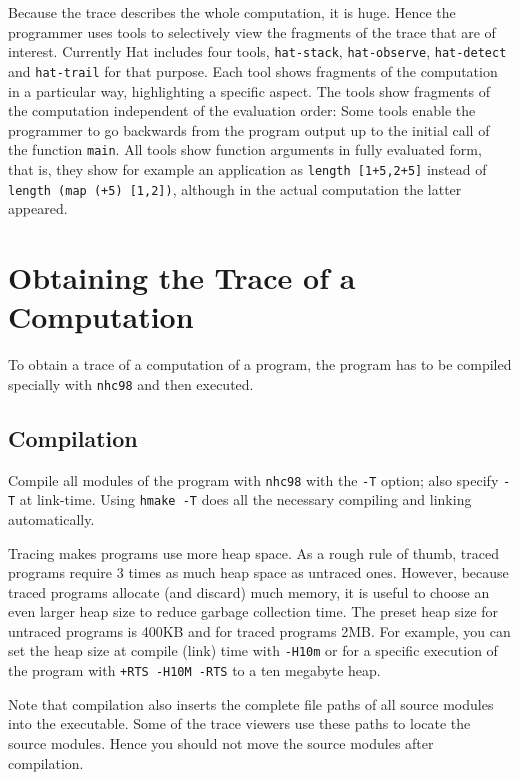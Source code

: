 \documentclass[12pt]{article}
\begin{document}
Because the trace describes the whole computation, it is huge. Hence the programmer uses tools to selectively view the fragments of the trace that are of interest.
Currently Hat includes four tools, \texttt{hat-stack}, \texttt{hat-observe}, \texttt{hat-detect} and \texttt{hat-trail} for that purpose. Each tool shows fragments of the computation in a particular way, highlighting a specific aspect.
The tools show fragments of the computation independent of the evaluation order:
Some tools enable the programmer to go backwards from the program output up to the initial call of the function \texttt{main}.
All tools show function arguments in fully evaluated form, that is, they show for example an application as \texttt{length [1+5,2+5]} instead of \texttt{length (map (+5) [1,2])}, although in the actual computation the latter appeared.



\section{Obtaining the Trace of a Computation}

To obtain a trace of a computation of a program, the program has to be compiled specially with \texttt{nhc98} and then executed.


\subsection{Compilation}

Compile all modules of the program with \texttt{nhc98} with the \texttt{-T} option; also specify \texttt{-T} at link-time.  Using \texttt{hmake -T} does
all the necessary compiling and linking automatically.

Tracing makes programs use more heap space. As a rough rule of thumb, traced programs require 3 times as much heap space as untraced ones. However, because traced programs allocate (and discard) much memory, it is useful to choose an even larger heap size to reduce garbage collection time.
The preset heap size for untraced programs is 400KB and for traced programs 2MB.
For example, you can set the heap size at compile (link) time with \texttt{-H10m} or for a specific execution of the program with \texttt{+RTS -H10M -RTS} to a ten megabyte heap.

Note that compilation also inserts the complete file paths of all source modules into the executable. Some of the trace viewers use these paths to locate the source modules. Hence you should not move the source modules after compilation.
\end{document}
